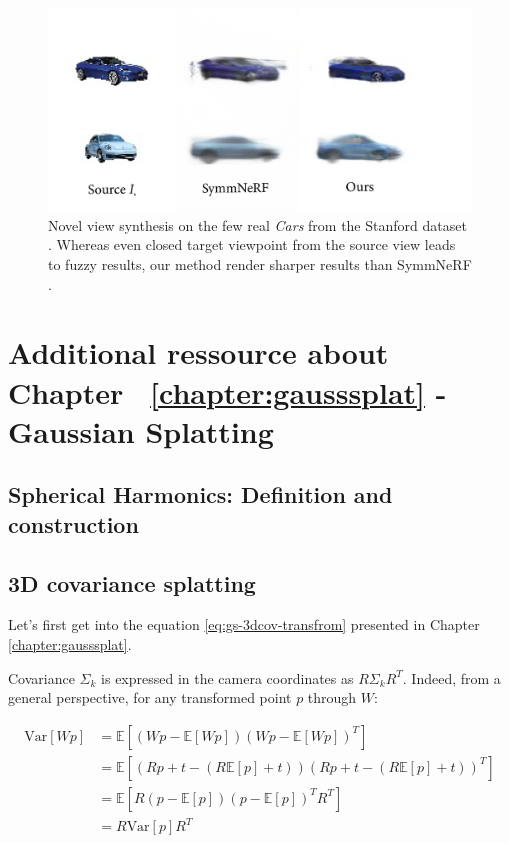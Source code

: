 \begin{figure}[h!]
    \begin{center}
  \includegraphics[width=\linewidth]{images/epinerf/supp_CarsStandford.png}
  \caption{Novel view synthesis on the few real \textit{Cars} from the Stanford dataset \citep{krause20133d}. Whereas even closed target viewpoint from the source view leads to fuzzy results, our method render sharper results than SymmNeRF \citep{li2022symmnerf}. }
  \label{fig:res_Stanfordcar}
  \end{center}
\end{figure}



\section{Additional ressource about Chapter ~\ref{chapter:gausssplat} - Gaussian Splatting}
\subsection{Spherical Harmonics: Definition and construction}
\label{appendix:gs-sh}

\subsection{3D covariance splatting}
\label{appendix:cov}
Let's first get into the equation \ref{eq:gs-3dcov-transfrom} presented in Chapter \ref{chapter:gausssplat}. 

Covariance $\Sigma_{k}$ is expressed in the camera coordinates as $R\Sigma_{k}R^{T}$. Indeed, from a general perspective, for any transformed point $p$ through $W$: 

\begin{equation}
    \begin{aligned}
    \text{Var}[Wp] &= \mathbb{E}[(Wp - \mathbb{E}[Wp])(Wp - \mathbb{E}[Wp])^T] \\
    &= \mathbb{E}[(Rp+t - (R\mathbb{E}[p]+t))(Rp+t - (R\mathbb{E}[p]+t))^T] \\
    &= \mathbb{E}[R(p - \mathbb{E}[p])(p - \mathbb{E}[p])^T R^T] \\
    &= R\text{Var}[p]R^T \\
    \end{aligned}
    \end{equation}

